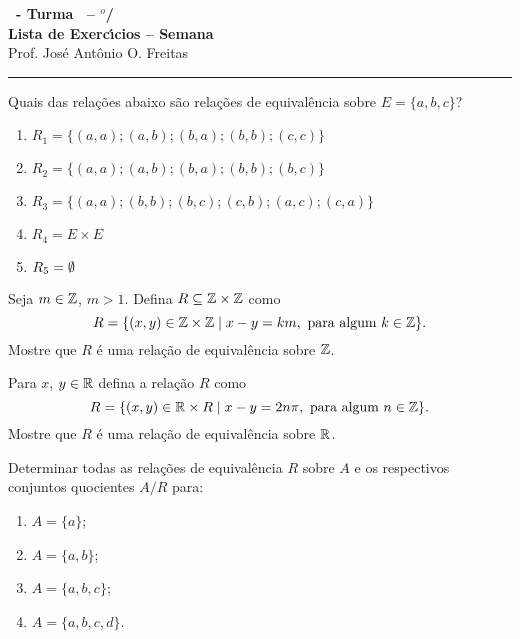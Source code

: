 \documentclass[12pt]{exam}
\begin{document}
    \begin{center}
    {\Large\bf \disciplina\ - Turma \turma\ -- \semestre$^{o}$/\ano} \\ \vspace{9pt} {\large\bf
        Lista de Exerc{\'\i}cios -- Semana \numerosemana}\\ \vspace{9pt} Prof. Jos{\'e} Ant{\^o}nio O. Freitas
    \end{center}
    \hrule

    \vspace{.6cm}

    \questao{} Quais das rela{\c c}{\~o}es abaixo s{\~a}o rela{\c c}{\~o}es de equival{\^e}ncia sobre $E = \{a,b,c\}$?
    \begin{enumerate}[label={\alph*})]
        \item $R_1 = \{(a,a);(a,b);(b,a);(b,b);(c,c)\}$
        \item $R_2 = \{(a,a);(a,b);(b,a);(b,b);(b,c)\}$
        \item $R_3 = \{(a,a);(b,b);(b,c);(c,b);(a,c);(c,a)\}$
        \item $R_4 = E \times E$
        \item $R_5 = \emptyset$
    \end{enumerate}

    \vspace{.3cm}

    \questao{} Seja $m \in \mathbb{Z}$, $m > 1$. Defina $R \subseteq \mathbb{Z}\times\mathbb{Z}$ como
    \[
      R = \{(x,y) \in \mathbb{Z}\times\mathbb{Z} \mid x - y = km, \mbox{ para algum } k \in \mathbb{Z}\}.
    \]
    Mostre que $R$ \'e uma rela\c{c}\~ao de equival\^encia sobre $\mathbb{Z}$.

    \vspace{.3cm}

    \questao{} Para $x$, $y \in \mathbb{R}$ defina a relação $R$ como
    \[
        R = \{(x,y) \in \mathbb{R} \times R \mid x - y = 2n\pi, \mbox{ para algum } n \in \mathbb{Z}\}.
    \]
    Mostre que $R$ é uma relação de equivalência sobre $\mathbb{R}$.

    \vspace{.3cm}

    \questao{} Determinar todas as rela{\c c}{\~o}es de equival{\^e}ncia
    $R$ sobre $A$ e os respectivos conjuntos quocientes $A/R$ para:
    \begin{enumerate}[label={\alph*})]
        \item $A=\{a\}$;
        \item $A=\{a,b\}$;
        \item $A=\{a,b,c\}$;
        \item $A=\{a,b,c,d\}$.
    \end{enumerate}
\end{document}
